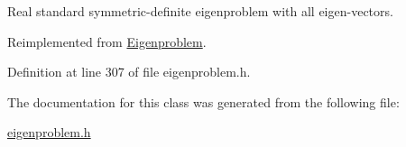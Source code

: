 Real standard symmetric-\/definite eigenproblem with all eigen-\/vectors. 



Reimplemented from \hyperlink{class_eigenproblem_a6e9369d5c158ee7b13f6504281069c60}{Eigenproblem}.



Definition at line 307 of file eigenproblem.\+h.



The documentation for this class was generated from the following file\+:\begin{DoxyCompactItemize}
\item 
\hyperlink{eigenproblem_8h}{eigenproblem.\+h}\end{DoxyCompactItemize}
